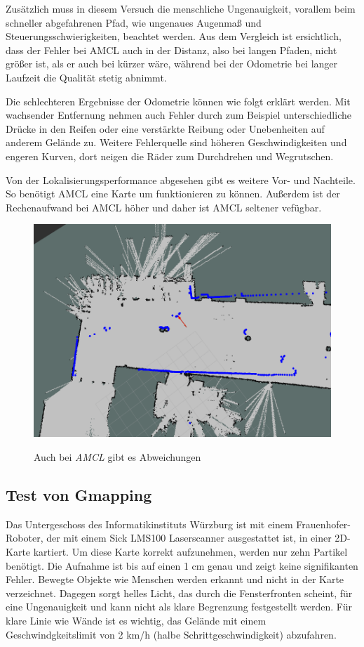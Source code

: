 \documentclass[11pt,a4paper]{article}
\begin{document}
{ Zus\"atzlich muss in diesem Versuch die menschliche Ungenauigkeit, vorallem beim schneller abgefahrenen Pfad, wie ungenaues Augenma{\ss} und Steuerungsschwierigkeiten, beachtet werden. Aus dem Vergleich ist ersichtlich, dass der Fehler bei AMCL auch in der Distanz, also bei langen Pfaden, nicht gr\"o{\ss}er ist, als er auch bei k\"urzer w\"are, w\"ahrend bei der Odometrie bei langer Laufzeit die Qualit\"at stetig abnimmt. 

Die schlechteren Ergebnisse der Odometrie k\"onnen wie folgt erkl\"art werden. Mit wachsender Entfernung nehmen auch Fehler durch zum Beispiel unterschiedliche Dr\"ucke in den Reifen oder eine verst\"arkte Reibung oder Unebenheiten auf anderem Gel\"ande zu. Weitere Fehlerquelle sind h\"oheren Geschwindigkeiten und engeren Kurven, dort neigen die R\"ader zum Durchdrehen und Wegrutschen. 	



Von der Lokalisierungsperformance abgesehen gibt es weitere Vor- und Nachteile. So ben\"otigt AMCL eine Karte um funktionieren zu k\"onnen. Au{\ss}erdem ist der Rechenaufwand bei AMCL h\"oher und daher ist AMCL seltener vef\"ugbar. 


\begin{figure}[h]
	\centering
	{\includegraphics[width=\linewidth]{pictures/amcl_fail.png}}
	\caption{ Auch bei \textit{AMCL} gibt es Abweichungen \label{fig:amclFails}}
\end{figure}




\subsection{Test von Gmapping}
{
	Das Untergeschoss des Informatikinstituts W\"urzburg ist mit einem Frauenhofer-Roboter, der mit einem Sick LMS100 Laserscanner ausgestattet ist, in einer 2D-Karte kartiert.  Um diese Karte korrekt aufzunehmen, werden nur zehn Partikel ben\"otigt. Die Aufnahme ist bis auf einen 1 cm genau und zeigt keine signifikanten Fehler. Bewegte Objekte wie Menschen werden erkannt und nicht in der Karte verzeichnet. Dagegen sorgt helles Licht, das durch die Fensterfronten scheint, f\"ur eine Ungenauigkeit und kann nicht als klare Begrenzung festgestellt werden. F\"ur klare Linie wie W\"ande ist es wichtig, das Gel\"ande mit einem Geschwindgkeitslimit von 2 km/h (halbe Schrittgeschwindigkeit) abzufahren.  
	
}}
\end{document}
